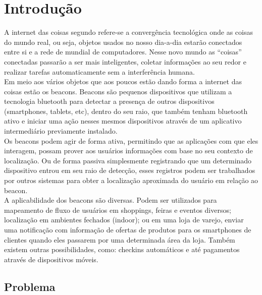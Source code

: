 \chapter{Introdução}
\label{cap:introducao}

A internet das coisas segundo \cite{Ashton} refere-se a convergência tecnológica onde as coisas do mundo real, ou seja, objetos usados no nosso dia-a-dia estarão conectados entre si e a rede de mundial de computadores. Nesse novo mundo as ``coisas” conectadas passarão a ser mais inteligentes, coletar informações ao seu redor e realizar tarefas automaticamente sem a interferência humana. \\
\indent Em meio aos vários objetos que aos poucos estão dando forma a internet das coisas estão os beacons. Beacons são pequenos dispositivos que utilizam a tecnologia bluetooth para detectar a presença de outros dispositivos (smartphones, tablets, etc), dentro do seu raio, que também tenham bluetooth ativo e iniciar uma ação nesses mesmos dispositivos através de um aplicativo intermediário previamente instalado. \\
\indent Os beacons podem agir de forma ativa, permitindo que as aplicações com que eles interagem, possam prover aos usuários informações com base no seu contexto de localização. Ou de forma passiva simplesmente registrando que um determinado dispositivo entrou em seu raio de detecção, esses registros podem ser trabalhados por outros sistemas para obter a localização aproximada do usuário em relação ao beacon. \\
\indent A aplicabilidade dos beacons são diversas. Podem ser utilizados para mapeamento de fluxo de usuários em shoppings, feiras e eventos diversos; localização em ambientes fechados (indoor); ou em uma loja de varejo, enviar uma notificação com informação de ofertas de produtos para os smartphones de clientes quando eles passarem por uma determinada área da loja. Também existem outras possibilidades, como: checkins automáticos e até pagamentos através de dispositivos móveis.



\section{Problema}
\label{sec:problema}

